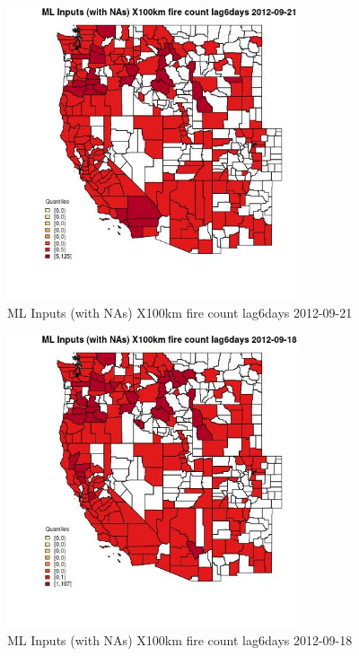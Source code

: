 \begin{figure} 
\centering  
\includegraphics[width=0.77\textwidth]{Code_Outputs/Report_ML_input_PM25_Step4_part_e_de_duplicated_aves_compiled_2019-05-14wNAs_CountyX100km_fire_count_lag6daysMean2012-09-21_2012-09-21.jpg} 
\caption{\label{fig:Report_ML_input_PM25_Step4_part_e_de_duplicated_aves_compiled_2019-05-14wNAsCountyX100km_fire_count_lag6daysMean2012-09-21_2012-09-21}ML Inputs (with NAs) X100km fire count lag6days 2012-09-21} 
\end{figure} 
 

\begin{figure} 
\centering  
\includegraphics[width=0.77\textwidth]{Code_Outputs/Report_ML_input_PM25_Step4_part_e_de_duplicated_aves_compiled_2019-05-14wNAs_CountyX100km_fire_count_lag6daysMean2012-09-18_2012-09-18.jpg} 
\caption{\label{fig:Report_ML_input_PM25_Step4_part_e_de_duplicated_aves_compiled_2019-05-14wNAsCountyX100km_fire_count_lag6daysMean2012-09-18_2012-09-18}ML Inputs (with NAs) X100km fire count lag6days 2012-09-18} 
\end{figure} 
 

